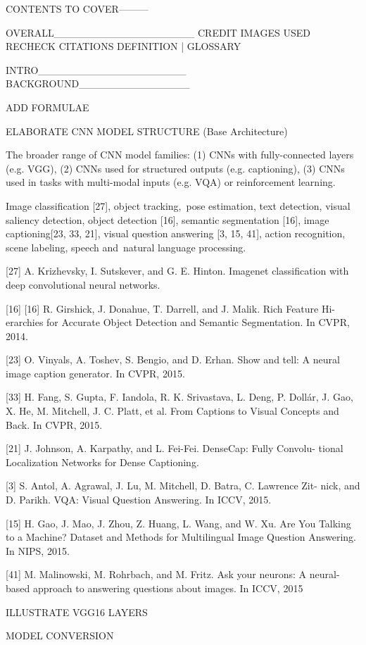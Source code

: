 CONTENTS TO COVER---------

OVERALL___________________
CREDIT IMAGES USED
RECHECK CITATIONS
DEFINITION | GLOSSARY


INTRO____________________
BACKGROUND_______________

ADD FORMULAE

ELABORATE CNN MODEL STRUCTURE (Base Architecture)

The broader range of CNN model families: (1) CNNs with fully-connected layers (e.g. VGG), (2) CNNs used for structured outputs (e.g. captioning), (3) CNNs used in tasks with multi-modal inputs (e.g. VQA) or reinforcement learning.


Image classification [27], object tracking, pose estimation, text detection, visual saliency detection, object detection [16], semantic segmentation [16], image captioning[23, 33, 21], visual question answering [3, 15, 41], action recognition, scene labeling, speech and natural language processing.

[27] A. Krizhevsky, I. Sutskever, and G. E. Hinton. Imagenet classification with deep convolutional neural networks.

[16] [16] R. Girshick, J. Donahue, T. Darrell, and J. Malik. Rich Feature Hi- erarchies for Accurate Object Detection and Semantic Segmentation. In CVPR, 2014.

[23] O. Vinyals, A. Toshev, S. Bengio, and D. Erhan. Show and tell: A neural image caption generator. In CVPR, 2015.

[33] H. Fang, S. Gupta, F. Iandola, R. K. Srivastava, L. Deng, P. Dollár, J. Gao, X. He, M. Mitchell, J. C. Platt, et al. From Captions to Visual Concepts and Back. In CVPR, 2015.

[21] J. Johnson, A. Karpathy, and L. Fei-Fei. DenseCap: Fully Convolu- tional Localization Networks for Dense Captioning. 

[3] S. Antol, A. Agrawal, J. Lu, M. Mitchell, D. Batra, C. Lawrence Zit- nick, and D. Parikh. VQA: Visual Question Answering. In ICCV, 2015.

[15] H. Gao, J. Mao, J. Zhou, Z. Huang, L. Wang, and W. Xu. Are You Talking to a Machine? Dataset and Methods for Multilingual Image Question Answering. In NIPS, 2015.

[41] M. Malinowski, M. Rohrbach, and M. Fritz. Ask your neurons: A neural-based approach to answering questions about images. In ICCV, 2015

ILLUSTRATE VGG16 LAYERS

MODEL CONVERSION

